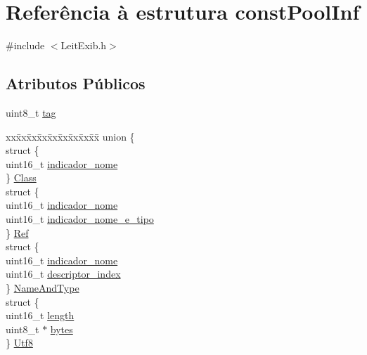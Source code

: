 \hypertarget{structconst_pool_inf}{\section{Referência à estrutura const\-Pool\-Inf}
\label{structconst_pool_inf}
}


{\ttfamily \#include $<$Leit\-Exib.\-h$>$}

\subsection*{Atributos Públicos}
\begin{DoxyCompactItemize}
\item 
uint8\-\_\-t \hyperlink{structconst_pool_inf_a6ea639ac2bd081a75fb00ee2231b5bf3}{tag}
\item 
\begin{tabbing}
xx\=xx\=xx\=xx\=xx\=xx\=xx\=xx\=xx\=\kill
union \{\\
\>struct \{\\
\>\>uint16\_t \hyperlink{structconst_pool_inf_a2f80c7393ff5829654d7418b7264110a}{indicador\_nome}\\
\>\} \hyperlink{structconst_pool_inf_adb4639fcbfae6547548f36dac46a1ce5}{Class}\\
\>struct \{\\
\>\>uint16\_t \hyperlink{structconst_pool_inf_a2f80c7393ff5829654d7418b7264110a}{indicador\_nome}\\
\>\>uint16\_t \hyperlink{structconst_pool_inf_adcd281157000a467608ba65cf1a6efb6}{indicador\_nome\_e\_tipo}\\
\>\} \hyperlink{structconst_pool_inf_ad0c502e47bccc75b8e939e5ccd1a8a16}{Ref}\\
\>struct \{\\
\>\>uint16\_t \hyperlink{structconst_pool_inf_a2f80c7393ff5829654d7418b7264110a}{indicador\_nome}\\
\>\>uint16\_t \hyperlink{structconst_pool_inf_a01d1f403e7ed5762b986ae2fe6e7db4b}{descriptor\_index}\\
\>\} \hyperlink{structconst_pool_inf_addb54edaecbb6a09ef4799c98134332a}{NameAndType}\\
\>struct \{\\
\>\>uint16\_t \hyperlink{structconst_pool_inf_a3c4be7f5456b58187d9695bb1d3c8871}{length}\\
\>\>uint8\_t $\ast$ \hyperlink{structconst_pool_inf_ad855f3fa643b42a9f2506f06d2f74310}{bytes}\\
\>\} \hyperlink{structconst_pool_inf_abf7874c7fbecc53ed38466b1ff897746}{Utf8}\\

\end{tabbing}
\end{DoxyCompactItemize}

